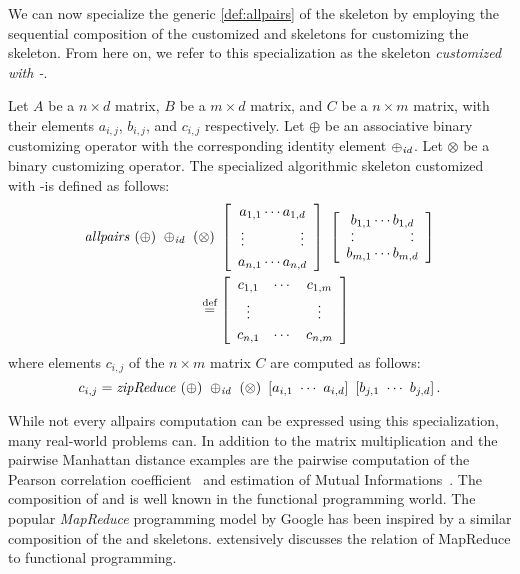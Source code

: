 We can now specialize the generic \autoref{def:allpairs} of the \allpairs skeleton by employing the sequential composition of the customized \reduce and \zip skeletons for customizing the \allpairs skeleton.
From here on, we refer to this specialization as the \allpairs skeleton \emph{customized with \zip-\reduce}.

\begin{definition}
  \label{def:allpairs:specialized}
  Let $A$ be a $n\times d$ matrix, $B$ be a $m\times d$ matrix, and $C$ be a $n\times m$ matrix, with their elements $a_{i,j}$, $b_{i,j}$, and $c_{i,j}$ respectively.
  Let $\oplus$ be an associative binary customizing operator with the corresponding identity element $\oplus_\text{\textit{id}}$.
  Let $\otimes$ be a binary customizing operator.
  The specialized algorithmic skeleton \allpairs customized with \zip-\reduce is defined as follows:
  \begin{equation*}
    \begin{split}
      \allpairs\ (\oplus)\ \oplus_\id\ (&\otimes)\ %
      \left[ \begin{array}{c} a_{1,1} \cdots a_{1,d}\\[.25em] \vdots \hspace{4em} \vdots\\[.25em] a_{n,1} \cdots a_{n,d} \end{array}\right]\ %
      \left[ \begin{array}{c} b_{1,1} \cdots b_{1,d}\\[-.25em] \cdot \hspace{4em} \cdot\\[-.75em] \cdot \hspace{4em} \cdot\\[-.25em] b_{m,1} \cdots b_{m,d} \end{array}\right]%
      \\
    &\eqdef \left[ \begin{array}{ccc} c_{1,1} & \cdots & c_{1,m}\\[.25em] \vdots & & \vdots\\[.25em] c_{n,1} & \cdots & c_{n,m} \end{array} \right]
    \end{split}
  \end{equation*}
  where elements $c_{i,j}$ of the $n\times m$ matrix $C$ are computed as follows:
  \[
    c_{i,j} = \text{\textit{zipReduce}}\ (\oplus)\ \oplus_\text{\textit{id}}\ (\otimes)\ \left[a_{i,1}\ \cdots\ a_{i,d}\right]\ \left[b_{j,1}\ \cdots\ b_{j,d}\right] .
  \]
\end{definition}


While not every allpairs computation can be expressed using this specialization, many real-world problems can.
In addition to the matrix multiplication and the pairwise Manhattan distance examples are the pairwise computation of the Pearson correlation coefficient~\cite{ChangDeQuRo2009} and estimation of Mutual Informations~\cite{DaubStSeKl2004}.
The composition of \zip and \reduce is well known in the functional programming world.
The popular \emph{MapReduce} programming model by Google has been inspired by a similar composition of the \map and \reduce skeletons.
\cite{Laemmel2007} extensively discusses the relation of MapReduce to functional programming.



